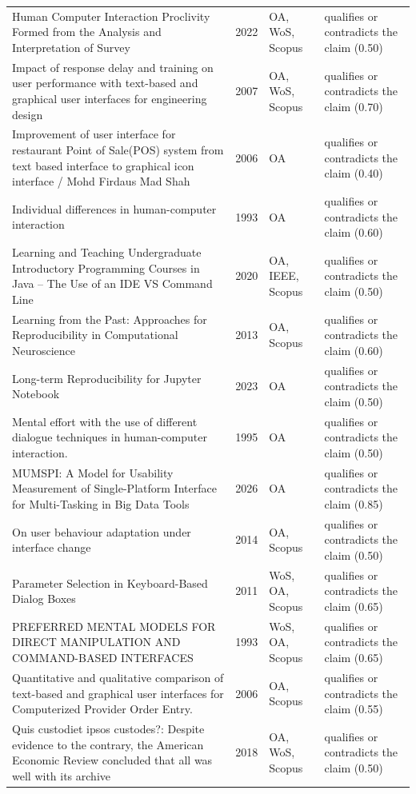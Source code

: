 \begin{longtable}{@{}%
  >{\raggedright\arraybackslash}p{}c%
  >{\raggedright\arraybackslash}p{}%
  >{\raggedright\arraybackslash}p{}@{}}
Human Computer Interaction Proclivity Formed from the Analysis and Interpretation of Survey & 2022 & OA, WoS, Scopus & qualifies or contradicts the claim (0.50) \\
Impact of response delay and training on user performance with text-based and graphical user interfaces for engineering design & 2007 & OA, WoS, Scopus & qualifies or contradicts the claim (0.70) \\
Improvement of user interface for restaurant Point of Sale(POS) system from text based interface to graphical icon interface / Mohd Firdaus Mad Shah & 2006 & OA & qualifies or contradicts the claim (0.40) \\
Individual differences in human-computer interaction & 1993 & OA & qualifies or contradicts the claim (0.60) \\
Learning and Teaching Undergraduate Introductory Programming Courses in Java -- The Use of an IDE VS Command Line & 2020 & OA, IEEE, Scopus & qualifies or contradicts the claim (0.50) \\
Learning from the Past: Approaches for Reproducibility in Computational Neuroscience & 2013 & OA, Scopus & qualifies or contradicts the claim (0.60) \\
Long-term Reproducibility for Jupyter Notebook & 2023 & OA & qualifies or contradicts the claim (0.50) \\
Mental effort with the use of different dialogue techniques in human-computer interaction. & 1995 & OA & qualifies or contradicts the claim (0.50) \\
MUMSPI: A Model for Usability Measurement of Single-Platform Interface for Multi-Tasking in Big Data Tools & 2026 & OA & qualifies or contradicts the claim (0.85) \\
On user behaviour adaptation under interface change & 2014 & OA, Scopus & qualifies or contradicts the claim (0.50) \\
Parameter Selection in Keyboard-Based Dialog Boxes & 2011 & WoS, OA, Scopus & qualifies or contradicts the claim (0.65) \\
PREFERRED MENTAL MODELS FOR DIRECT MANIPULATION AND COMMAND-BASED INTERFACES & 1993 & WoS, OA, Scopus & qualifies or contradicts the claim (0.65) \\
Quantitative and qualitative comparison of text-based and graphical user interfaces for Computerized Provider Order Entry. & 2006 & OA, Scopus & qualifies or contradicts the claim (0.55) \\
Quis custodiet ipsos custodes?: Despite evidence to the contrary, the American Economic Review concluded that all was well with its archive & 2018 & OA, WoS, Scopus & qualifies or contradicts the claim (0.50) \\

\end{longtable}
